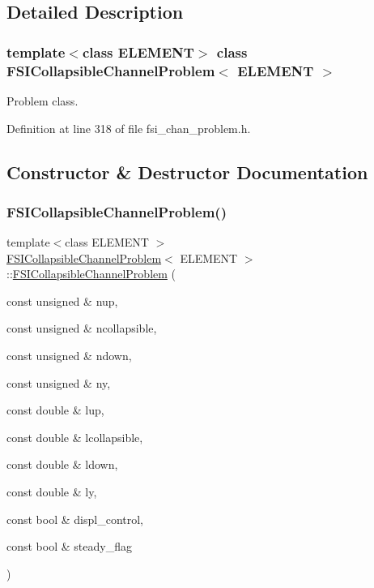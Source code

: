 \subsection{Detailed Description}
\subsubsection*{template$<$class E\+L\+E\+M\+E\+NT$>$\newline
class F\+S\+I\+Collapsible\+Channel\+Problem$<$ E\+L\+E\+M\+E\+N\+T $>$}

Problem class. 

Definition at line 318 of file fsi\+\_\+chan\+\_\+problem.\+h.



\subsection{Constructor \& Destructor Documentation}
\mbox{\label{classFSICollapsibleChannelProblem_a74efdd9ed027ab0ca5cf59ec8da6b95c}} 
\subsubsection{\texorpdfstring{F\+S\+I\+Collapsible\+Channel\+Problem()}{FSICollapsibleChannelProblem()}}
{\footnotesize\ttfamily template$<$class E\+L\+E\+M\+E\+NT $>$ \\
\hyperlink{classFSICollapsibleChannelProblem}{F\+S\+I\+Collapsible\+Channel\+Problem}$<$ E\+L\+E\+M\+E\+NT $>$\+::\hyperlink{classFSICollapsibleChannelProblem}{F\+S\+I\+Collapsible\+Channel\+Problem} (\begin{DoxyParamCaption}\item[{const unsigned \&}]{nup,  }\item[{const unsigned \&}]{ncollapsible,  }\item[{const unsigned \&}]{ndown,  }\item[{const unsigned \&}]{ny,  }\item[{const double \&}]{lup,  }\item[{const double \&}]{lcollapsible,  }\item[{const double \&}]{ldown,  }\item[{const double \&}]{ly,  }\item[{const bool \&}]{displ\+\_\+control,  }\item[{const bool \&}]{steady\+\_\+flag }\end{DoxyParamCaption})}



